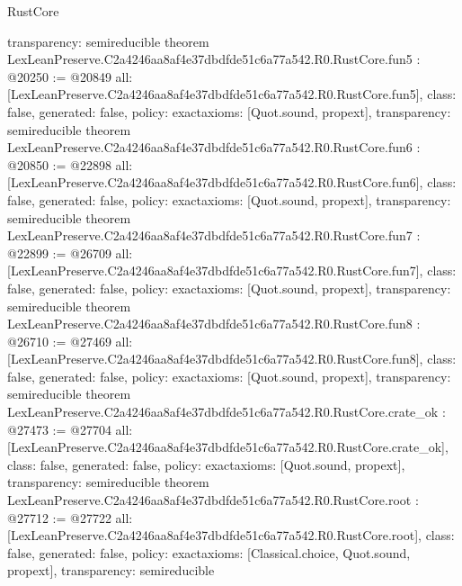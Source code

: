 \begin{lexlean}{RustCore}
\begin{coremodule}
{  transparency: semireducible
}
theorem LexLeanPreserve.C2a4246aa8af4e37dbdfde51c6a77a542.R0.RustCore.fun5 : @20250 := @20849 {
  all: [LexLeanPreserve.C2a4246aa8af4e37dbdfde51c6a77a542.R0.RustCore.fun5],
  class: false,
  generated: false,
  policy: exact{axioms: [Quot.sound, propext]},
  transparency: semireducible
}
theorem LexLeanPreserve.C2a4246aa8af4e37dbdfde51c6a77a542.R0.RustCore.fun6 : @20850 := @22898 {
  all: [LexLeanPreserve.C2a4246aa8af4e37dbdfde51c6a77a542.R0.RustCore.fun6],
  class: false,
  generated: false,
  policy: exact{axioms: [Quot.sound, propext]},
  transparency: semireducible
}
theorem LexLeanPreserve.C2a4246aa8af4e37dbdfde51c6a77a542.R0.RustCore.fun7 : @22899 := @26709 {
  all: [LexLeanPreserve.C2a4246aa8af4e37dbdfde51c6a77a542.R0.RustCore.fun7],
  class: false,
  generated: false,
  policy: exact{axioms: [Quot.sound, propext]},
  transparency: semireducible
}
theorem LexLeanPreserve.C2a4246aa8af4e37dbdfde51c6a77a542.R0.RustCore.fun8 : @26710 := @27469 {
  all: [LexLeanPreserve.C2a4246aa8af4e37dbdfde51c6a77a542.R0.RustCore.fun8],
  class: false,
  generated: false,
  policy: exact{axioms: [Quot.sound, propext]},
  transparency: semireducible
}
theorem LexLeanPreserve.C2a4246aa8af4e37dbdfde51c6a77a542.R0.RustCore.crate_ok : @27473 := @27704 {
  all: [LexLeanPreserve.C2a4246aa8af4e37dbdfde51c6a77a542.R0.RustCore.crate_ok],
  class: false,
  generated: false,
  policy: exact{axioms: [Quot.sound, propext]},
  transparency: semireducible
}
theorem LexLeanPreserve.C2a4246aa8af4e37dbdfde51c6a77a542.R0.RustCore.root : @27712 := @27722 {
  all: [LexLeanPreserve.C2a4246aa8af4e37dbdfde51c6a77a542.R0.RustCore.root],
  class: false,
  generated: false,
  policy: exact{axioms: [Classical.choice, Quot.sound, propext]},
  transparency: semireducible
}


\end{coremodule}
\end{lexlean}
